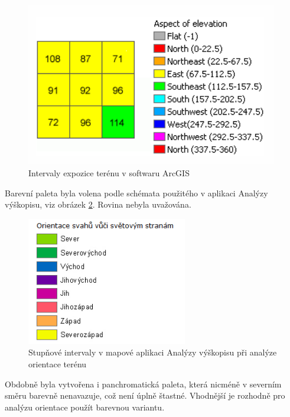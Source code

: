 \documentclass[a4paper,11pt,twoside]{article}
\begin{document}
\vspace{0.2cm}
\begin{figure}[hbt!] 
\begin{center}
\includegraphics[width=11cm]{pictures/aspect.PNG} 
\caption[Intervaly expozice terénu v softwaru ArcGIS]{Intervaly expozice terénu v softwaru ArcGIS \cite{aspect}}
\label{fig:aspect}
\end{center}
\end{figure}

Barevní paleta byla volena podle schémata použitého v aplikaci Analýzy výškopisu, viz obrázek \ref{fig:analyzy_aspect}. Rovina nebyla uvažována.

\vspace{0.2cm}
\begin{figure}[hbt!] 
\begin{center}
\includegraphics[width=7cm]{pictures/analyzy_aspect.PNG} 
\caption[Stupňové intervaly v mapové aplikaci Analýzy výškopisu při analýze orientace terénu ]{Stupňové intervaly v mapové aplikaci Analýzy výškopisu při analýze orientace terénu}
\label{fig:analyzy_aspect}
\end{center}
\end{figure}

\newpage
Obdobně byla vytvořena i panchromatická paleta, která nicméně v severním směru barevně nenavazuje, což není úplně štastné. Vhodnější je rozhodně pro analýzu orientace použít barevnou variantu.
\end{document}
